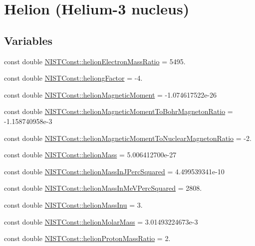 \hypertarget{group___helion}{}\section{Helion (Helium-\/3 nucleus)}
\label{group___helion}
\subsection*{Variables}
\begin{DoxyCompactItemize}
\item 
const double \hyperlink{group___helion_ga5c779784a4f223f0936cb067e2674474}{N\+I\+S\+T\+Const\+::helion\+Electron\+Mass\+Ratio} = 5495.
\item 
const double \hyperlink{group___helion_ga93c08fee128607b2609355ea6ddbc76e}{N\+I\+S\+T\+Const\+::heliong\+Factor} = -\/4.
\item 
const double \hyperlink{group___helion_ga06d8cffa7452ce8d1d30334e89fddc55}{N\+I\+S\+T\+Const\+::helion\+Magnetic\+Moment} = -\/1.\+074617522e-\/26
\item 
const double \hyperlink{group___helion_gab2ead007452b8d42528f8d03d988d149}{N\+I\+S\+T\+Const\+::helion\+Magnetic\+Moment\+To\+Bohr\+Magneton\+Ratio} = -\/1.\+158740958e-\/3
\item 
const double \hyperlink{group___helion_ga4abc0d1191b0610736c6f70a56c24562}{N\+I\+S\+T\+Const\+::helion\+Magnetic\+Moment\+To\+Nuclear\+Magneton\+Ratio} = -\/2.
\item 
const double \hyperlink{group___helion_gac36ce0665418a2b628ca7c28c8887d2b}{N\+I\+S\+T\+Const\+::helion\+Mass} = 5.\+006412700e-\/27
\item 
const double \hyperlink{group___helion_ga51d52d347de11b15efccd0613db9abe3}{N\+I\+S\+T\+Const\+::helion\+Mass\+In\+J\+Perc\+Squared} = 4.\+499539341e-\/10
\item 
const double \hyperlink{group___helion_gaa7af65f7f94682dba2c3b50a24dafe02}{N\+I\+S\+T\+Const\+::helion\+Mass\+In\+Me\+V\+Perc\+Squared} = 2808.
\item 
const double \hyperlink{group___helion_ga764735e9b705bc9493bd45acb466a7e9}{N\+I\+S\+T\+Const\+::helion\+Mass\+Inu} = 3.
\item 
const double \hyperlink{group___helion_gac7da5201f92f47f4ca2310ae1c9f4fb6}{N\+I\+S\+T\+Const\+::helion\+Molar\+Mass} = 3.\+01493224673e-\/3
\item 
const double \hyperlink{group___helion_ga6ddd4a293fd1d7adac9a20dc6ee2a7d6}{N\+I\+S\+T\+Const\+::helion\+Proton\+Mass\+Ratio} = 2.

\end{DoxyCompactItemize}
